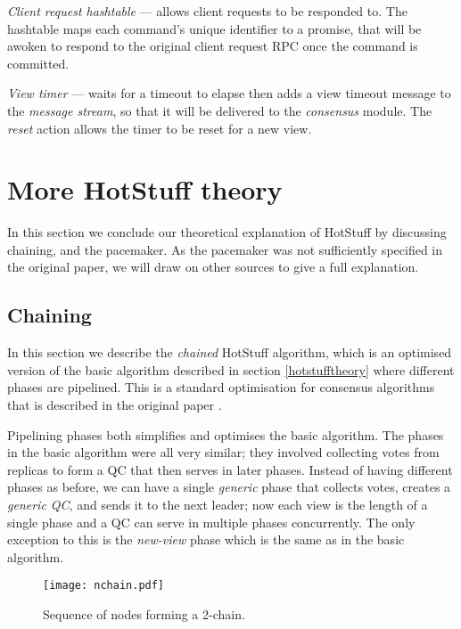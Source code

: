 \begin{description}
	\item \textit{Client request hashtable} --- allows client requests to be responded to. The hashtable maps each command's unique identifier to a promise, that will be awoken to respond to the original client request RPC once the command is committed.
	\item \textit{View timer} --- waits for a timeout to elapse then adds a view timeout message to the \textit{message stream}, so that it will be delivered to the \textit{consensus} module. The \textit{reset} action allows the timer to be reset for a new view.
\end{description}

\section{More HotStuff theory} \label{moretheory}
In this section we conclude our theoretical explanation of HotStuff by discussing chaining, and the pacemaker. As the pacemaker was not sufficiently specified in the original paper, we will draw on other sources to give a full explanation.

\subsection{Chaining} \label{chaining}

In this section we describe the \textit{chained} HotStuff algorithm, which is an optimised version of the basic algorithm described in section \ref{hotstufftheory} where different phases are pipelined. This is a standard optimisation for consensus algorithms that is described in the original paper \cite{yinHotStuffBFTConsensus2019}.

Pipelining phases both simplifies and optimises the basic algorithm. The phases in the basic algorithm were all very similar; they involved collecting votes from replicas to form a QC that then serves in later phases. Instead of having different phases as before, we can have a single \textit{generic} phase that collects votes, creates a \textit{generic QC}, and sends it to the next leader; now each view is the length of a single phase and a QC can serve in multiple phases concurrently. The only exception to this is the \textit{new-view} phase which is the same as in the basic algorithm.

\begin{figure}[h!]
\centering
\texttt{[image: nchain.pdf]}
\caption{Sequence of nodes forming a 2-chain.}
\label{nchain}
\end{figure}

